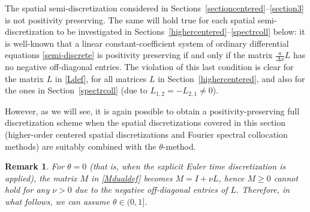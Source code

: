 \documentclass[smallextended,numbook,runningheads]{svjour3}     %
\newtheorem{remark}{Remark}
\newtheorem{remark}{Remark}
\newcommand{\dx}{\Delta x}
\begin{document}
The spatial semi-discretization considered in Sections~\ref{sectioncentered}--\ref{section3} is not positivity preserving. The same will hold true for each spatial semi-discretization to be investigated in Sections~\ref{highercentered}--\ref{spectrcoll} below: it is well-known \cite[Chapter I,
Theorem 7.2]{hundsdorferverwer} that a linear constant-coefficient system of ordinary differential equations 
\eqref{semi-discrete} is positivity preserving if and only if the
matrix $\frac{a}{\dx}L$ has no negative off-diagonal entries. The violation of this last condition is clear for the matrix 
$L$ in \eqref{Ldef}, for all matrices $L$ in Section~\ref{highercentered}, and also for the ones in Section~\ref{spectrcoll} (due to $L_{1,2}=-L_{2,1}\ne 0$).

However, as we will see, it is again possible to obtain a positivity-preserving full discretization scheme when the spatial
discretizations covered in this section (higher-order centered
spatial discretizations and Fourier spectral collocation methods) are suitably combined  with the $\theta$-method.
\begin{remark}
For $\theta=0$ (that is, when the explicit Euler time discretization is applied), the matrix $M$ in
\eqref{Mdualdef} becomes $M = I + \nu L$, hence $M \ge 0$ cannot hold for any $\nu > 0$ due to the
negative off-diagonal entries of $L$.
Therefore, in what follows, we can assume $\theta \in (0,1]$.
\end{remark}

\end{document}

